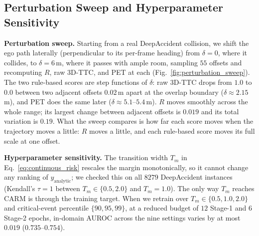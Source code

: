 \documentclass[letterpaper, 10 pt, conference]{ieeeconf}  %
\begin{document}
\subsection{Perturbation Sweep and Hyperparameter Sensitivity}
\label{sec:exp_sensitivity}

\noindent\textbf{Perturbation sweep.}
Starting from a real DeepAccident collision, we shift the ego path
laterally (perpendicular to its per-frame heading) from $\delta=0$, where
it collides, to $\delta=6$\,m, where it passes with ample room, sampling
$55$ offsets and recomputing $R$, raw 3D-TTC, and PET at each
(Fig.~\ref{fig:perturbation_sweep}). The two rule-based scores are step
functions of $\delta$: raw 3D-TTC drops from $1.0$ to $0.0$ between two
adjacent offsets $0.02$\,m apart at the overlap boundary
($\delta\approx2.15$\,m), and PET does the same later
($\delta\approx5.1$--$5.4$\,m). $R$ moves smoothly across the whole
range; its largest change between adjacent offsets is $0.019$ and its
total variation is $0.19$. What the sweep compares is how far each score
moves when the trajectory moves a little: $R$ moves a little, and each
rule-based score moves its full scale at one offset.

\noindent\textbf{Hyperparameter sensitivity.}
The transition width $T_m$ in Eq.~\eqref{eq:continuous_risk} rescales the
margin monotonically, so it cannot change any ranking of
$y_{\mathrm{analytic}}$; we checked this on all $8279$ DeepAccident
instances (Kendall's $\tau=1$ between $T_m\in\{0.5,2.0\}$ and
$T_m=1.0$). The only way $T_m$ reaches CARM is through the training
target. When we retrain over $T_m\in\{0.5,1.0,2.0\}$ and critical-event
percentile $\{90,95,99\}$, at a reduced budget of $12$ Stage-1 and $6$
Stage-2 epochs, in-domain AUROC across the nine settings varies by at
most $0.019$ ($0.735$--$0.754$).


\end{document}
